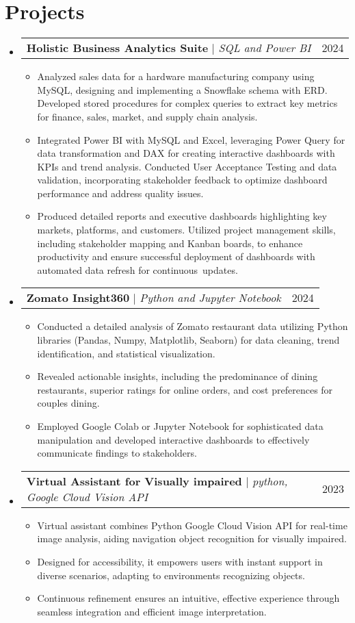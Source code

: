 \documentclass[letterpaper,11pt]{article}
\makeatletter
\newcommand{\resumeItem}[1]{
  \item\small{
    {#1 \vspace{-2pt}}
  }
}
\newcommand{\resumeProjectHeading}[2]{
    \item
    \begin{tabular*}{0.97\textwidth}{l@{\extracolsep{\fill}}r}
      \small#1 & #2 \\
    \end{tabular*}\vspace{-7pt}
}
\newcommand{\resumeSubHeadingListStart}{\begin{itemize}[leftmargin=0.15in, label={}]}
\newcommand{\resumeSubHeadingListEnd}{\end{itemize}}
\newcommand{\resumeItemListStart}{\begin{itemize}}
\newcommand{\resumeItemListEnd}{\end{itemize}\vspace{-5pt}}
\makeatother
\begin{document}
\section{Projects}
\resumeSubHeadingListStart
  \resumeProjectHeading
    {\textbf{Holistic Business Analytics Suite} $|$ \textit{SQL and Power BI}}{2024}
    \resumeItemListStart
      \resumeItem{Analyzed sales data for a hardware manufacturing company using MySQL, designing and implementing a Snowflake schema with ERD. Developed stored procedures for complex queries to extract key metrics for finance, sales, market, and supply chain analysis.}
      \resumeItem{Integrated Power BI with MySQL and Excel, leveraging Power Query for data transformation and DAX for creating interactive dashboards with KPIs and trend analysis. Conducted User Acceptance Testing and data validation, incorporating stakeholder feedback to optimize dashboard performance and address quality issues.}
      \resumeItem{Produced detailed reports and executive dashboards highlighting key markets, platforms, and customers. Utilized project management skills, including stakeholder mapping and Kanban boards, to enhance productivity and ensure successful deployment of dashboards with automated data refresh for continuous updates.}
    \resumeItemListEnd
  \resumeProjectHeading
    {\textbf{Zomato Insight360} $|$ \textit{Python and Jupyter Notebook}}{2024}
    \resumeItemListStart
      \resumeItem{Conducted a detailed analysis of Zomato restaurant data utilizing Python libraries (Pandas, Numpy, Matplotlib, Seaborn) for data cleaning, trend identification, and statistical visualization.}
      \resumeItem{Revealed actionable insights, including the predominance of dining restaurants, superior ratings for online orders, and cost preferences for couples dining.}
      \resumeItem{Employed Google Colab or Jupyter Notebook for sophisticated data manipulation and developed interactive dashboards to effectively communicate findings to stakeholders.}
    \resumeItemListEnd
  \resumeProjectHeading
    {\textbf{Virtual Assistant for Visually impaired} $|$ \textit{python, Google Cloud Vision API}}{2023}
    \resumeItemListStart
      \resumeItem{Virtual assistant combines Python Google Cloud Vision API for real-time image analysis, aiding navigation object
recognition for visually impaired.}
      \resumeItem{Designed for accessibility, it empowers users with instant support in diverse scenarios, adapting to environments
recognizing objects.}
      \resumeItem{Continuous refinement ensures an intuitive, effective experience through seamless integration and efficient image
interpretation.}
    \resumeItemListEnd
\resumeSubHeadingListEnd
\end{document}
